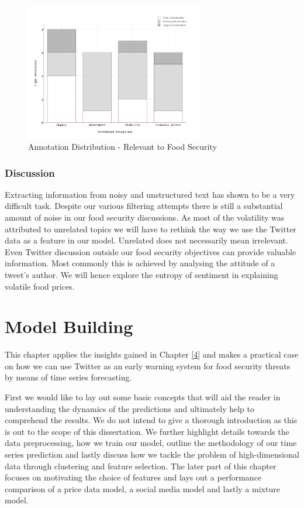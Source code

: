 \begin{figure}[H]
        \centering
         \includegraphics[width=0.7\textwidth ]{img/anal/annotation_dist}
              
        \caption{Annotation Distribution - Relevant to Food Security}
        \label{fig:annotation_dist}
\end{figure}


\subsection{Discussion}

Extracting information from noisy and unstructured text has shown to be a very difficult task. Despite our various filtering attempts there is still a substantial amount of noise in our food security discussions. As most of the volatility was attributed to unrelated topics we will have to rethink the way we use the Twitter data as a feature in our model. Unrelated does not necessarily mean irrelevant. Even Twitter discussion outside our food security objectives can provide valuable information. Most commonly this is achieved by analysing the attitude of a tweet's author. We will hence explore the entropy of sentiment in explaining volatile food prices. 





\chapter {Model Building}
\label{model}
This chapter applies the insights gained in Chapter \ref{4} and makes a practical case on how we can use Twitter as an early warning system for food security threats by means of time series forecasting. 

First we would like to lay out some basic concepts that will aid the reader in understanding the dynamics of the predictions and ultimately help to comprehend the results. We do not intend to give a thorough introduction as this is out to the scope of this dissertation. We further highlight details towards the data preprocessing, how we train our model, outline the methodology of our time series prediction and lastly discuss how we tackle the problem of high-dimensional data through clustering and feature selection. The later part of this chapter focuses on motivating the choice of features and lays out a performance comparison of a price data model, a social media model and lastly a mixture model.  



